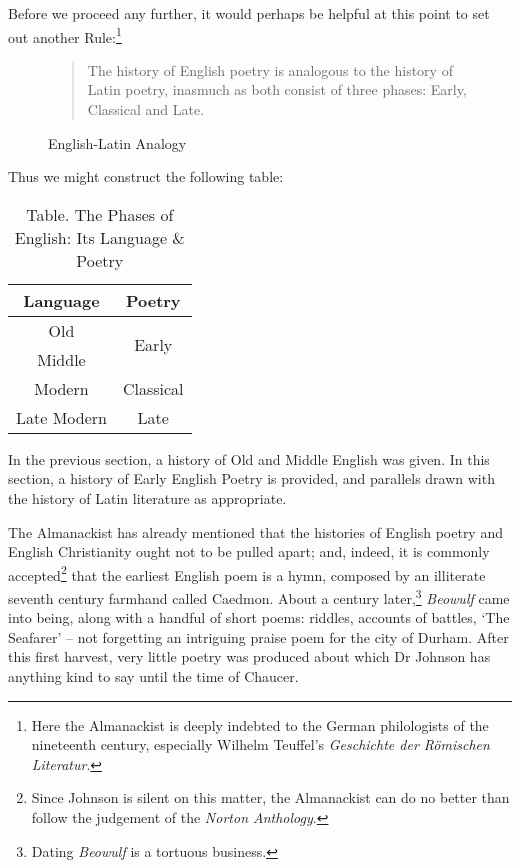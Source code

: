 \documentclass[0main.tex]{subfiles}
\begin{document}
Before we proceed any further, it would perhaps be helpful at this point to set out another Rule:\footnote{Here the Almanackist is deeply indebted to the German philologists of the nineteenth century, especially Wilhelm Teuffel's \emph{Geschichte der R\"omischen Literatur}.}

\begin{figure}[h]
\caption{English-Latin Analogy}
\begin{quote}
The history of English poetry is analogous to the history of Latin poetry, inasmuch as both consist of three phases: Early, Classical and Late.
\end{quote}
\end{figure}

Thus we might construct the following table:

\begin{table}[h]
\centering
\caption*{{\sc Table.} The Phases of English: Its Language \& Poetry}
\begin{tabular}{c|c}
Language & Poetry \\ \hline \hline
Old & \multirow{2}{*}{Early} \\
Middle & \\ \hline
Modern & Classical \\ \hline
Late Modern & Late \\
\end{tabular}
\end{table}

In the previous section, a history of Old and Middle English was given. In this section, a history of Early English Poetry is provided, and parallels drawn with the history of Latin literature as appropriate.

The Almanackist has already mentioned that the histories of English poetry and English Christianity ought not to be pulled apart; and, indeed, it is commonly accepted\footnote{Since Johnson is silent on this matter, the Almanackist can do no better than follow the judgement of the \emph{Norton Anthology}.} that the earliest English poem is a hymn, composed by an illiterate seventh century farmhand called Caedmon. About a century later,\footnote{Dating \emph{Beowulf} is a tortuous business.} \emph{Beowulf} came into being, along with a handful of short poems: riddles, accounts of battles, `The Seafarer' -- not forgetting an intriguing praise poem for the city of Durham. After this first harvest, very little poetry was produced about which Dr Johnson has anything kind to say until the time of Chaucer.
\end{document}
